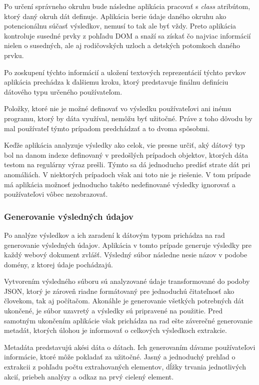 Po určení správneho okruhu bude následne aplikácia pracovať s \textit{class} atribútom, ktorý daný okruh dát definuje. Aplikácia berie údaje daného okruhu ako potencionálnu súčasť výsledkov, nemusí to tak ale byť  vždy. Preto aplikácia kontroluje susedné prvky z pohľadu DOM a snaží sa získať čo najviac informácií nielen o susedných, ale aj rodičovských uzloch a detských potomkoch daného prvku.

Po zoskupení týchto informácií a uložení textových reprezentácií týchto prvkov aplikácia prechádza k ďalšiemu kroku, ktorý predstavuje finálnu definíciu  dátového typu určeného používateľom.

\bigskip

Položky, ktoré nie je možné definovať vo výsledku používateľovi ani inému programu, ktorý by dáta využíval, nemôžu byť užitočné. Práve z toho dôvodu by mal používateľ týmto prípadom predchádzať a to dvoma spôsobmi. 

Keďže aplikácia analyzuje výsledky ako celok, vie presne určiť, aký dátový typ bol na danom indexe definovaný v predošlých prípadoch objektov, ktorých dáta testom na regulárny výraz prešli. Týmto sa dá jednoducho predísť strate dát pri anomáliách. V niektorých prípadoch však ani toto nie je riešenie. V tom prípade má aplikácia možnosť jednoducho takéto nedefinované výsledky ignorovať a používateľovi vôbec nezobrazovať.

\subsubsection{Generovanie výsledných údajov}

Po analýze výsledkov a ich zaradení k dátovým typom prichádza na rad generovanie výsledných údajov. Aplikácia v tomto prípade generuje výsledky pre každý webový dokument zvlášť. Výsledný súbor následne nesie názov v podobe domény, z ktorej údaje pochádzajú.

Vytvorením výsledného súboru sú analyzované údaje transformované do podoby JSON, ktorý je zároveň riadne formátovaný pre jednoduchú čitateľnosť ako človekom, tak aj počítačom. Akonáhle je generovanie všetkých potrebných dát ukončené, je súbor uzavretý a výsledky sú pripravené na použitie. Pred samotným ukončením aplikácie však prichádza na rad ešte záverečné generovanie metadát, ktorých úlohou je informovať o celkových výsledkoch extrakcie.

Metadáta predstavujú akési dáta o dátach. Ich generovaním dávame používateľovi informácie, ktoré môže pokladať za užitočné. Jasný a jednoduchý prehľad o extrakcii z pohľadu počtu extrahovaných elementov, dĺžky trvania jednotlivých akcií, priebeh analýzy a odkaz na prvý cielený element.

